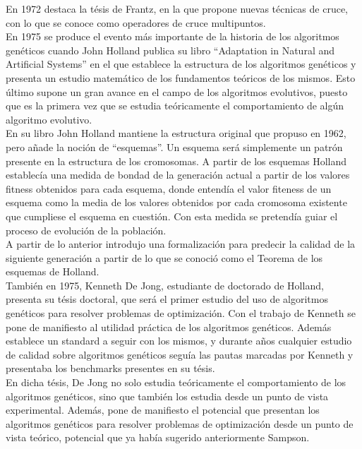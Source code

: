 \documentclass[12pt]{article} \usepackage[utf8x]{inputenc}
\begin{document}
En 1972 destaca la tésis de Frantz, en la que propone nuevas técnicas de cruce, 
con lo que se conoce como operadores de cruce multipuntos.\\



En 1975 se produce el evento más importante de la historia de los algoritmos 
genéticos cuando John Holland publica su libro ``Adaptation in Natural and 
Artificial Systems'' en el que establece la estructura de los  algoritmos 
genéticos y presenta un estudio matemático de los fundamentos teóricos de los 
mismos. Esto último supone un gran avance en el campo de los algoritmos 
evolutivos, puesto que es la primera vez que se estudia teóricamente el 
comportamiento de algún algoritmo evolutivo.\\


En su libro John Holland mantiene la estructura original que propuso en 1962, 
pero añade la noción de ``esquemas''. Un esquema será simplemente un patrón 
presente en la estructura de los cromosomas. A partir de los esquemas  Holland 
establecía una medida de bondad de la generación actual a partir de los valores 
fitness obtenidos para cada esquema, donde entendía el valor fiteness de un 
esquema como la media de los valores obtenidos por cada cromosoma existente que 
cumpliese el esquema en cuestión. Con esta medida se pretendía guiar el proceso 
de evolución de la población. \\

A partir de lo anterior introdujo una formalización para predecir la calidad de 
la siguiente generación a partir de lo que se conoció como el Teorema de los 
esquemas de Holland.\\


También en 1975, Kenneth De Jong, estudiante de doctorado de Holland, presenta 
su tésis doctoral, que será el primer estudio del uso de algoritmos genéticos 
para resolver problemas de optimización. Con el trabajo de Kenneth se pone de 
manifiesto al utilidad práctica de los algoritmos genéticos. Además establece 
un standard a seguir con los mismos, y durante años cualquier estudio de calidad
sobre algoritmos genéticos seguía las pautas marcadas por Kenneth y presentaba 
los benchmarks presentes en su tésis.\\

En dicha tésis, De Jong no solo estudia teóricamente el comportamiento de los 
algoritmos genéticos, sino que también los estudia desde un punto de vista 
experimental. Además, pone de manifiesto el potencial que presentan los algoritmos 
genéticos para resolver problemas de optimización desde un punto de vista teórico, 
potencial que ya había sugerido anteriormente Sampson.\\
\end{document}
